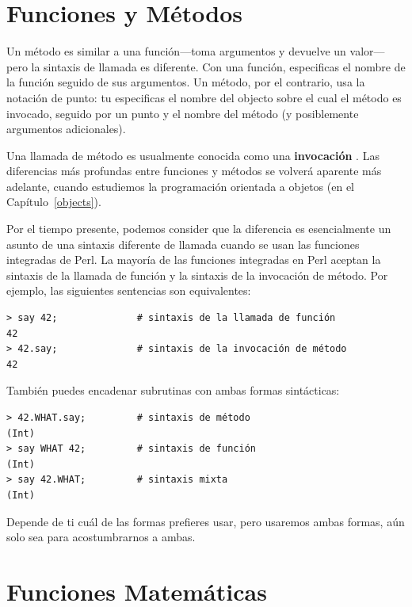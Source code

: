 \section{Funciones y Métodos}

Un método es similar a una función---toma argumentos y 
devuelve un valor---pero la sintaxis de llamada es
diferente. Con una función, especificas el nombre de la función
seguido de sus argumentos. Un método, por el contrario, usa 
la notación de punto: tu especificas el nombre del objecto
sobre el cual el método es invocado, seguido por un punto y
el nombre del método (y posiblemente argumentos adicionales).

% 
Una llamada de método es usualmente conocida como una 
{\bf invocación} . Las diferencias más
profundas entre funciones y métodos se volverá aparente 
más adelante, cuando estudiemos la programación orientada
a objetos (en el Capítulo~\ref{objects}).

Por el tiempo presente, podemos consider que la diferencia
es esencialmente un asunto de una sintaxis diferente de 
llamada cuando se usan las funciones integradas de Perl. La mayoría
de las funciones integradas en Perl aceptan la sintaxis de la llamada
de función y la sintaxis de la invocación de método. Por ejemplo,
las siguientes sentencias son equivalentes:

\begin{lstlisting}
> say 42;              # sintaxis de la llamada de función
42
> 42.say;              # sintaxis de la invocación de método
42
\end{lstlisting}
%

También puedes encadenar subrutinas con ambas formas
sintácticas:

\begin{lstlisting}
> 42.WHAT.say;         # sintaxis de método
(Int)
> say WHAT 42;         # sintaxis de función
(Int)
> say 42.WHAT;         # sintaxis mixta
(Int)
\end{lstlisting}
%

Depende de ti cuál de las formas prefieres usar, pero
usaremos ambas formas, aún solo sea para acostumbrarnos
a ambas.

\section{Funciones Matemáticas}

